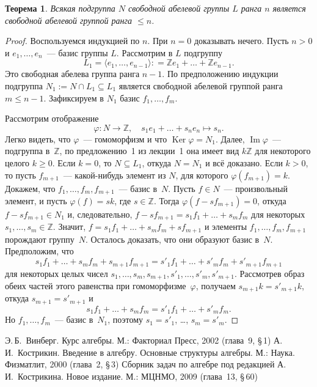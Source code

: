 \documentclass[a4paper,10pt]{amsart}
\newcommand{\Ker}{\mathop{\mathrm{Ker}}}
\renewcommand{\Im}{\mathop{\mathrm{Im}}}
\def\ZZ{{\mathbb Z}}%
\newtheorem{theorem}{Теорема}
\theoremstyle{definition}
\theoremstyle{remark}
\begin{document}
\begin{theorem}
Всякая подгруппа $N$ свободной абелевой группы $L$ ранга $n$
является свободной абелевой группой ранга $\leqslant n$.
\end{theorem}

\begin{proof}
Воспользуемся индукцией по $n$. При $n=0$ доказывать нечего. Пусть
$n>0$ и $e_1,\ldots,e_n$~--- базис группы $L$. Рассмотрим в $L$
подгруппу
$$
L_1 = \langle e_1,\ldots,e_{n-1}\rangle : = \ZZ e_1 + \ldots + \ZZ
e_{n-1}.
$$
Это свободная абелева группа ранга $n-1$. По предположению индукции
подгруппа $N_1:=N\cap L_1 \subseteq L_1$ является свободной абелевой
группой ранга $m \leqslant n-1$. Зафиксируем в $N_1$ базис $f_1,
\ldots, f_m$.

Рассмотрим отображение
$$
\varphi \colon N \to \ZZ, \quad s_1e_1 + \ldots + s_ne_n \mapsto
s_n.
$$
Легко видеть, что $\varphi$~--- гомоморфизм и что $\Ker \varphi =
N_1$. Далее, $\Im \varphi$~--- подгруппа в~$\ZZ$, по предложению~1
из лекции~1 она имеет вид $k \ZZ$ для некоторого целого $k \geqslant
0$. Если $k=0$, то $N \subseteq L_1$, откуда $N = N_1$ и всё
доказано. Если $k>0$, то пусть $f_{m+1}$~--- какой-нибудь элемент из
$N$, для которого $\varphi(f_{m+1}) = k$. Докажем, что $f_1, \ldots,
f_m, f_{m+1}$~--- базис в~$N$. Пусть $f \in N$~--- произвольный
элемент, и пусть $\varphi(f) = sk$, где $s \in \ZZ$. Тогда
$\varphi(f - sf_{m+1}) = 0$, откуда $f - sf_{m+1} \in N_1$ и,
следовательно, $f - sf_{m+1} = s_1 f_1 + \ldots + s_m f_m$ для
некоторых $s_1, \ldots, s_m \in \ZZ$. Значит, $f = s_1 f_1 + \ldots
+ s_m f_m + s f_{m+1}$ и элементы $f_1, \ldots, f_m, f_{m+1}$
порождают группу~$N$. Осталось доказать, что они образуют базис
в~$N$. Предположим, что
$$
s_1 f_1 + \ldots + s_m f_m + s_{m+1} f_{m+1} = s'_1 f_1 + \ldots +
s'_m f_m + s'_{m+1} f_{m+1}
$$
для некоторых целых чисел $s_1, \ldots, s_m, s_{m+1}, s'_1, \ldots,
s'_m, s'_{m+1}$. Рассмотрев образ обеих частей этого равенства при
гомоморфизме~$\varphi$, получаем $s_{m+1} k = s'_{m+1} k$, откуда
$s_{m+1} = s'_{m+1}$ и
$$
s_1 f_1 + \ldots + s_m f_m = s'_1 f_1 + \ldots + s'_m f_m.
$$
Но $f_1, \ldots, f_m$~--- базис в~$N_1$, поэтому $s_1 = s'_1$,
\ldots, $s_m = s'_m$.
\end{proof}


\bigskip

\begin{thebibliography}{99}
Э.\,Б.~Винберг. Курс алгебры. М.: Факториал Пресс, 2002 (глава~9,
\S\,1)
А.\,И.~Кострикин. Введение в алгебру. Основные структуры алгебры.
М.: Наука. Физматлит, 2000 (глава~2, \S\,3)
Сборник задач по алгебре под редакцией А.\,И.~Кострикина. Новое
издание. М.: МЦНМО, 2009 (глава~13, \S\,60)
\end{thebibliography}
\end{document}
